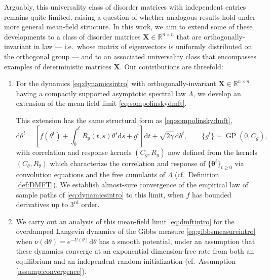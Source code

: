 \documentclass[11pt,letterpaper,reqno]{amsart}
\def\R{\mathbb{R}}
\def\d{\mathrm{d}}
\def\btheta{\boldsymbol{\theta}}
\def\X{\mathbf{X}}
\def\GP{\operatorname{GP}}
\theoremstyle{definition}
\numberwithin{equation}{section}
\begin{document}
Arguably, this universality class of disorder matrices with independent entries remains quite limited, raising a question of whether analogous results hold under more general mean-field structure. In this work, we aim to extend some of these developments to a class of disorder
matrices $\X \in \R^{n \times n}$ that are orthogonally-invariant in law ---
i.e.\ whose matrix of eigenvectors is uniformly distributed on the orthogonal
group --- and to an associated universality class that encompasses examples of
deterministic matrices $\X$. Our contributions are threefold:
\begin{enumerate}[1.]
\item For the dynamics \eqref{eq:dynamicsintro} with 
orthogonally-invariant $\X \in \R^{n \times n}$ having a compactly supported
asymptotic spectral law $\Lambda$, we develop an extension of the
mean-field limit \eqref{eq:sompolinskydmft}.

This extension has the same structural form as \eqref{eq:sompolinskydmft},
\begin{equation}\label{eq:dmftintro}
\d\theta^t=\left[f(\theta^t)+\int_0^t R_g(t,s)\theta^s \d s+g^t\right]\d t
+\sqrt{2\gamma}\,\d b^t,
\qquad \{g^t\} \sim \GP(0,C_g),
\end{equation}
with correlation and response kernels $(C_g,R_g)$ now defined from the kernels $(C_\theta,R_\theta)$ which characterize the correlation and response of $\{\btheta^t\}_{t \geq 0}$ via convolution equations and the free cumulants of
$\Lambda$ (cf.\ Definition \ref{def:DMFT}). We establish almost-sure
convergence of the empirical law of sample paths of \eqref{eq:dynamicsintro} to this limit, when $f$  has bounded derivatives up to $3^\text{rd}$ order.  \\

\item We carry out an analysis of this mean-field limit \eqref{eq:dmftintro}
for the overdamped Langevin dynamics of the Gibbs measure
\eqref{eq:gibbsmeasureintro} when $\nu(\d\theta)=e^{-U(\theta)}\d\theta$
has a smooth potential,
under an assumption that these dynamics converge at an
exponential dimension-free rate from both an equilibrium and an independent
random initialization (cf.\ Assumption \ref{assump:convergence}).


\end{enumerate}
\end{document}
